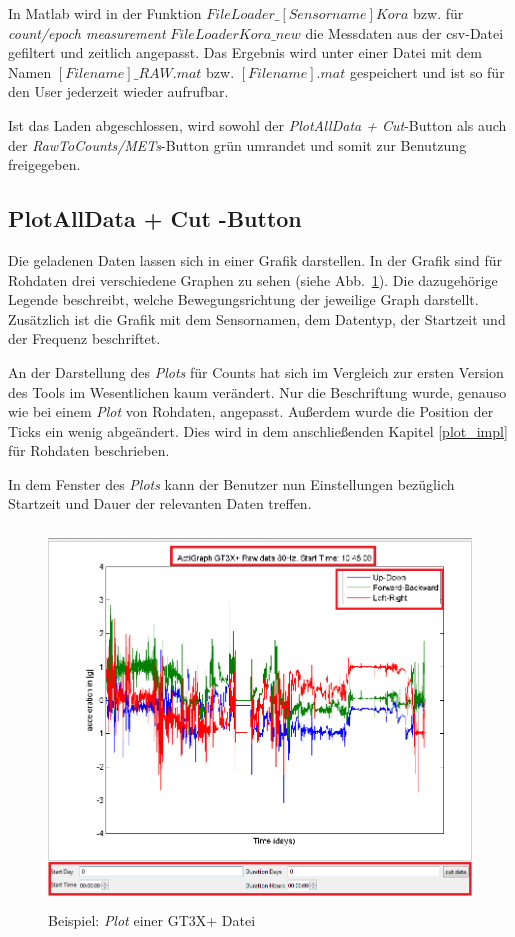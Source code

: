 \documentclass[onecolumn,german]{article}
\begin{document}
In Matlab wird in der Funktion \textit{$FileLoader\_[Sensorname]Kora$} bzw. für \textit{count/epoch measurement} \textit{$FileLoaderKora\_new$} die Messdaten aus der csv-Datei gefiltert und zeitlich angepasst. Das Ergebnis wird unter einer Datei mit dem Namen \textit{$[Filename]\_RAW.mat$} bzw. \textit{$[Filename].mat$} gespeichert und ist so für den User jederzeit wieder aufrufbar.\newline

Ist das Laden abgeschlossen, wird sowohl der \textit{PlotAllData + Cut}-Button als auch der \textit{RawToCounts/METs}-Button grün umrandet und somit zur Benutzung freigegeben.

\subsection{PlotAllData + Cut -Button}
\label{Plot/Cut}

Die geladenen Daten lassen sich in einer Grafik darstellen. In der Grafik sind für Rohdaten drei verschiedene Graphen zu sehen (siehe Abb.~\ref{plot}). Die dazugehörige Legende beschreibt, welche Bewegungsrichtung der jeweilige Graph darstellt. Zusätzlich ist die Grafik mit dem Sensornamen, dem Datentyp, der Startzeit und der Frequenz beschriftet.

An der Darstellung des \textit{Plots} für Counts hat sich im Vergleich zur ersten Version des Tools im Wesentlichen kaum verändert. Nur die Beschriftung wurde, genauso wie bei einem \textit{Plot} von Rohdaten, angepasst. Außerdem wurde die Position der Ticks ein wenig abgeändert. Dies wird in dem anschließenden Kapitel \ref{plot_impl} für Rohdaten beschrieben. \newline

In dem Fenster des \textit{Plots} kann der Benutzer nun Einstellungen bezüglich Startzeit und Dauer der relevanten Daten treffen.\newline

\begin{figure}[H]
\centerline{
\includegraphics[width=125mm, height=100mm]{Abbildungen/Plot.png}
}
\caption {Beispiel: \textit{Plot} einer GT3X+ Datei}
\label{plot}
\end{figure}
\end{document}
